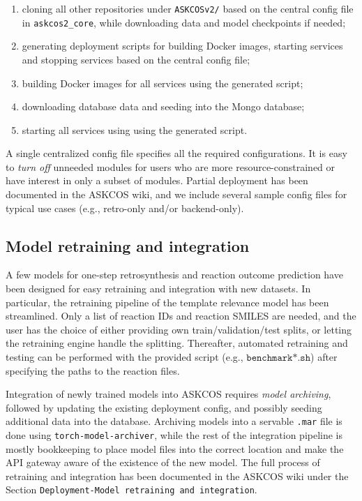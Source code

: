 \documentclass[pdflatex,sn-mathphys-num]{sn-jnl}%
\theoremstyle{thmstyleone}%
\theoremstyle{thmstyletwo}%
\theoremstyle{thmstylethree}%
\begin{document}
\begin{enumerate}
    \item cloning all other repositories under \texttt{ASKCOSv2/} based on the central config file in \texttt{askcos2\_core}, while downloading data and model checkpoints if needed;
    \item generating deployment scripts for building Docker images, starting services and stopping services based on the central config file;
    \item building Docker images for all services using the generated script;
    \item downloading database data and seeding into the Mongo database;
    \item starting all services using using the generated script.
\end{enumerate}

A single centralized config file specifies all the required configurations. It is easy to \emph{turn off} unneeded modules for users who are more resource-constrained or have interest in only a subset of modules. Partial deployment has been documented in the ASKCOS wiki, and we include several sample config files for typical use cases (e.g., retro-only and/or backend-only).

\subsection{Model retraining and integration}\label{method_retraining}


A few models for one-step retrosynthesis and reaction outcome prediction have been designed for easy retraining and integration with new datasets. In particular, the retraining pipeline of the template relevance model has been streamlined. Only a list of reaction IDs and reaction SMILES are needed, and the user has the choice of either providing own train/validation/test splits, or letting the retraining engine handle the splitting. Thereafter, automated retraining and testing can be performed with the provided script (e.g., $\texttt{benchmark*.sh}$) after specifying the paths to the reaction files.

Integration of newly trained models into ASKCOS requires \emph{model archiving}, followed by updating the existing deployment config, and possibly seeding additional data into the database. Archiving models into a servable \texttt{.mar} file is done using \texttt{torch-model-archiver}, while the rest of the integration pipeline is mostly bookkeeping to place model files into the correct location and make the API gateway aware of the existence of the new model. The full process of retraining and integration has been documented in the ASKCOS wiki under the Section \texttt{Deployment-Model retraining and integration}.
\end{document}
